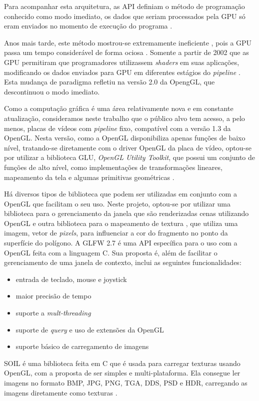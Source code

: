 Para acompanhar esta arquitetura, as \acrshort{API} definiam o método de programação conhecido como modo imediato, os dados que seriam processados pela \acrshort{GPU} só eram enviados no momento de execução do programa \cite{imediato}. 

Anos mais tarde, este método mostrou-se extremamente ineficiente \cite{learnopengl}, pois a \acrshort{GPU} passa um tempo considerável de forma ociosa \cite{opengl3th}. Somente a partir de 2002 que as \acrshort{GPU} permitiram que programadores utilizassem \emph{shaders} em suas aplicações, modificando os dados enviados para \acrshort{GPU} em diferentes estágios do \emph{pipeline} \cite{nvidia}. Esta mudança de paradigma refletiu na versão 2.0 da OpengGL, que descontinuou o modo imediato.

Como a computação gráfica é uma área relativamente nova e em constante atualização, consideramos neste trabalho que o público alvo tem acesso, a pelo menos, placas de vídeos com \emph{pipeline} fixo, compatível com a versão 1.3 da OpenGL. Nesta versão, como a OpenGL disponibiliza apenas funções de baixo nível, tratando-se diretamente com o driver OpenGL da placa de vídeo, optou-se por utilizar a biblioteca GLU, \emph{OpenGL Utility Toolkit}, que possui um conjunto de funções de alto nível, como implementações de transformações lineares, mapeamento da tela e algumas primitivas geométricas \cite{glu}.  

Há diversos tipos de biblioteca que podem ser utilizadas em conjunto com a OpenGL que facilitam o seu uso. Neste projeto, optou-se por utilizar uma biblioteca para o gerenciamento da janela que são renderizadas cenas utilizando OpenGL e outra biblioteca para o mapeamento de textura \cite{angel6th}, que utiliza uma imagem, vetor de \emph{pixels}, para influenciar a cor do fragmento no ponto da superfície do polígono.
A GLFW 2.7 é uma API específica para o uso com a OpenGL feita com a linguagem C. Sua proposta é, além de facilitar o gerenciamento de uma janela de contexto, inclui as seguintes funcionalidades:
\begin{itemize}
  \item entrada de teclado, mouse e joystick
  \item maior precisão de tempo
  \item suporte a \emph{mult-threading}
  \item suporte de \emph{query} e uso de extensões da OpenGL
  \item suporte básico de carregamento de imagens
\end{itemize}
SOIL é uma biblioteca feita em C que é usada para carregar texturas usando OpenGL, com a proposta de ser simples e multi-plataforma. Ela consegue ler imagens no formato BMP, JPG, PNG, TGA, DDS, PSD e HDR, carregando as imagens diretamente como texturas \cite{SOIL}.

